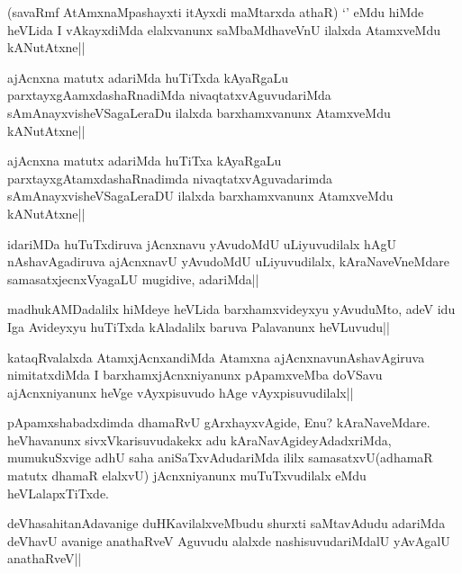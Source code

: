 \begin{artha}
(savaRmf AtAmxnaMpashayxti itAyxdi maMtarxda athaR) `\stext' eMdu hiMde heVLida I vAkayxdiMda elalxvanunx saMbaMdhaveVnU ilalxda AtamxveMdu kANutAtxne||
\end{artha}

\begin{artha}
ajAcnxna matutx adariMda huTiTxda kAyaRgaLu parxtayxgAamxdashaRnadiMda nivaqtatxvAguvudariMda sAmAnayxvisheVSagaLeraDu ilalxda barxhamxvanunx AtamxveMdu kANutAtxne||
\end{artha}

\begin{artha}
ajAcnxna matutx adariMda huTiTxa kAyaRgaLu parxtayxgAtamxdashaRnadimda nivaqtatxvAguvadarimda sAmAnayxvisheVSagaLeraDU ilalxda barxhamxvanunx AtamxveMdu kANutAtxne||
\end{artha}

\begin{artha}
idariMDa huTuTxdiruva jAcnxnavu yAvudoMdU uLiyuvudilalx hAgU nAshavAgadiruva ajAcnxnavU yAvudoMdU uLiyuvudilalx, kAraNaveVneMdare samasatxjecnxVyagaLU mugidive, adariMda||
\end{artha}

\begin{artha}
madhukAMDadalilx hiMdeye heVLida barxhamxvideyxyu yAvuduMto, adeV idu Iga Avideyxyu huTiTxda kAladalilx baruva Palavanunx heVLuvudu||
\end{artha}


\begin{artha}
kataqRvalalxda AtamxjAcnxandiMda Atamxna ajAcnxnavunAshavAgiruva nimitatxdiMda I barxhamxjAcnxniyanunx pApamxveMba doVSavu ajAcnxniyanunx heVge vAyxpisuvudo hAge vAyxpisuvudilalx||
\end{artha}


\begin{artha}
pApamxshabadxdimda dhamaRvU gArxhayxvAgide, Enu? kAraNaveMdare. heVhavanunx sivxVkarisuvudakekx adu kAraNavAgideyAdadxriMda, mumukuSxvige adhU saha aniSaTxvAdudariMda ililx samasatxvU(adhamaR matutx dhamaR elalxvU) jAcnxniyanunx muTuTxvudilalx eMdu heVLalapxTiTxde.
\end{artha}


\begin{artha}
deVhasahitanAdavanige duHKavilalxveMbudu shurxti saMtavAdudu adariMda deVhavU avanige anathaRveV Aguvudu alalxde nashisuvudariMdalU yAvAgalU anathaRveV||
\end{artha}

